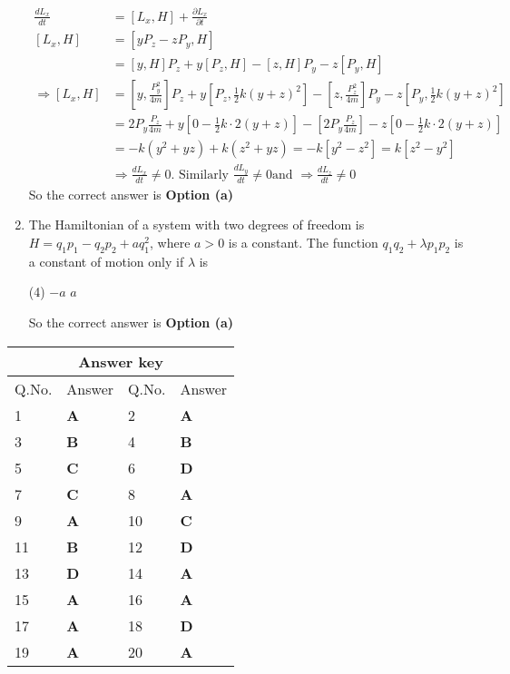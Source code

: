 \begin{enumerate}
\begin{answer}
\begin{align*}
	\frac{d L_{x}}{d t}&=\left[L_{x}, H\right]+\frac{\partial L_{x}}{\partial t}\\
	\left[L_{x}, H\right]&=\left[y P_{z}-z P_{y}, H\right]\\&=[y, H] P_{z}+y\left[P_{z}, H\right]-[z, H] P_{y}-z\left[P_{y}, H\right]\\
	\Rightarrow\left[L_{x}, H\right]&=\left[y, \frac{P_{y}^{2}}{4 m}\right] P_{z}+y\left[P_{z}, \frac{1}{2} k(y+z)^{2}\right]-\left[z, \frac{P_{z}^{2}}{4 m}\right] P_{y}-z\left[P_{y}, \frac{1}{2} k(y+z)^{2}\right]\\
	&=2 P_{y} \frac{P_{z}}{4 m}+y\left[0-\frac{1}{2} k \cdot 2(y+z)\right]-\left[2 P_{y} \frac{P_{z}}{4 m}\right]-z\left[0-\frac{1}{2} k \cdot 2(y+z)\right]\\
	&=-k\left(y^{2}+y z\right)+k\left(z^{2}+y z\right)=-k\left[y^{2}-z^{2}\right]=k\left[z^{2}-y^{2}\right]\\
	&\Rightarrow \frac{d L_{x}}{d t} \neq 0 .\text{ Similarly }\frac{d L_{y}}{d t} \neq 0 \text{and }\Rightarrow \frac{d L_{z}}{d t} \neq 0
	\end{align*}
	So the correct answer is \textbf{Option (a)}
\end{answer}
	\item  The Hamiltonian of a system with two degrees of freedom is $H=q_{1} p_{1}-q_{2} p_{2}+a q_{1}^{2}$, where $a>0$ is a constant. The function $q_{1} q_{2}+\lambda p_{1} p_{2}$ is a constant of motion only if $\lambda$ is
	{}
	\begin{tasks}(4)
		\task[\textbf{c.}]$-a$
		\task[\textbf{d.}]$a$ 
	\end{tasks}
\begin{answer}
	So the correct answer is \textbf{Option (a)}
\end{answer}
\end{enumerate}
\setlength\arrayrulewidth{1pt}
\begin{table}[H]
	\centering
	\begin{tabular}{|p{1.5cm}|p{1.5cm}||p{1.5cm}|p{1.5cm}|}
		\hline
		\multicolumn{4}{|c|}{\textbf{Answer key}}\\\hline\hline
		\rowcolor{ocrel}Q.No.&Answer&Q.No.&Answer\\\hline
		1&\textbf{A} &2&\textbf{A}\\\hline 
		3&\textbf{B} &4&\textbf{B} \\\hline
		5&\textbf{C} &6&\textbf{D} \\\hline
		7&\textbf{C}&8&\textbf{A}\\\hline
		9&\textbf{A}&10&\textbf{C}\\\hline
		11&\textbf{B}&12&\textbf{D}\\\hline
		13&\textbf{D}&14&\textbf{A}\\\hline
		15&\textbf{A}&16&\textbf{A}\\\hline
		17&\textbf{A} &18&\textbf{D}\\\hline
		19&\textbf{A}&20&\textbf{A}\\\hline
		
	\end{tabular}
\end{table}
